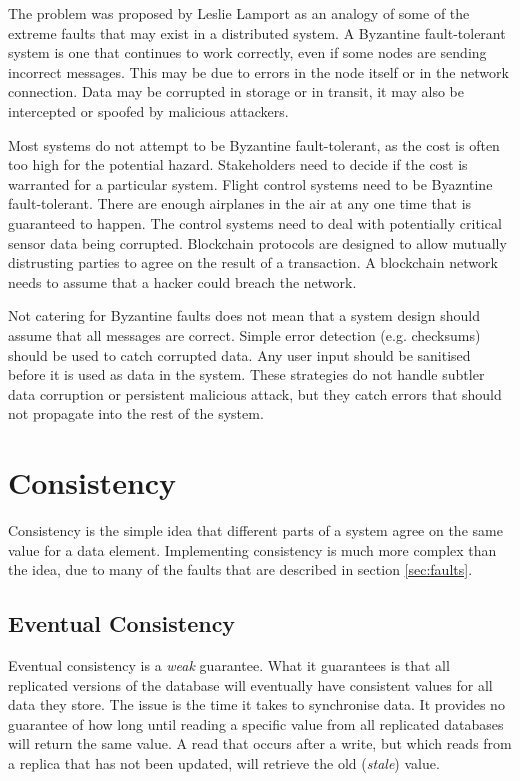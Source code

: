The problem was proposed by Leslie Lamport as an analogy of some of the extreme faults that may exist in a distributed system.
A Byzantine fault-tolerant system is one that continues to work correctly, even if some nodes are sending incorrect messages.
This may be due to errors in the node itself or in the network connection.
Data may be corrupted in storage or in transit, it may also be intercepted or spoofed by malicious attackers.

Most systems do not attempt to be Byzantine fault-tolerant, as the cost is often too high for the potential hazard.
Stakeholders need to decide if the cost is warranted for a particular system.
Flight control systems need to be Byazntine fault-tolerant.
There are enough airplanes in the air at any one time that
is guaranteed to happen.
The control systems need to deal with potentially critical sensor data being corrupted.
Blockchain protocols are designed to allow mutually distrusting parties to agree on the result of a transaction.
A blockchain network needs to assume that a hacker could breach the network.

Not catering for Byzantine faults does not mean that a system design should assume that all messages are correct.
Simple error detection (e.g. checksums) should be used to catch corrupted data.
Any user input should be sanitised before it is used as data in the system.
These strategies do not handle subtler data corruption or persistent malicious attack,
but they catch errors that should not propagate into the rest of the system.


\section{Consistency}
Consistency is the simple idea that different parts of a system agree on the same value for a data element.
Implementing consistency is much more complex than the idea, due to many of the faults that are described in section \ref{sec:faults}.

\subsection{Eventual Consistency}

Eventual consistency is a \emph{weak} guarantee.
What it guarantees is that all replicated versions of the database will eventually have consistent values for all data they store.
The issue is the time it takes to synchronise data.
It provides no guarantee of how long until reading a specific value from all replicated databases will return the same value.
A read that occurs after a write, but which reads from a replica that has not been updated, will retrieve the old (\emph{stale}) value.

